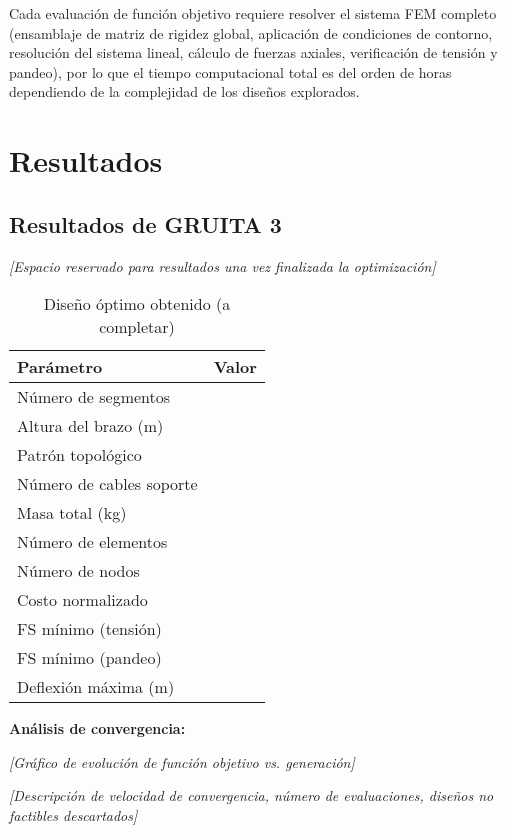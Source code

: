 \documentclass[10pt,a4paper]{article}
\begin{document}
Cada evaluación de función objetivo requiere resolver el sistema FEM completo (ensamblaje de matriz de rigidez global, aplicación de condiciones de contorno, resolución del sistema lineal, cálculo de fuerzas axiales, verificación de tensión y pandeo), por lo que el tiempo computacional total es del orden de horas dependiendo de la complejidad de los diseños explorados.

\section{Resultados}

\subsection{Resultados de GRUITA 3}

\textit{[Espacio reservado para resultados una vez finalizada la optimización]}

\vspace{1cm}

\begin{table}[H]
\small
\centering
\caption{Diseño óptimo obtenido (a completar)}
\begin{tabular}{lr}
\toprule
\textbf{Parámetro} & \textbf{Valor} \\
\midrule
Número de segmentos & \\
Altura del brazo (m) & \\
Patrón topológico & \\
Número de cables soporte & \\
\midrule
Masa total (kg) & \\
Número de elementos & \\
Número de nodos & \\
Costo normalizado & \\
\midrule
FS mínimo (tensión) & \\
FS mínimo (pandeo) & \\
Deflexión máxima (m) & \\
\bottomrule
\end{tabular}
\end{table}

\vspace{0.5cm}

\textbf{Análisis de convergencia:}

\textit{[Gráfico de evolución de función objetivo vs. generación]}

\textit{[Descripción de velocidad de convergencia, número de evaluaciones, diseños no factibles descartados]}
\end{document}
